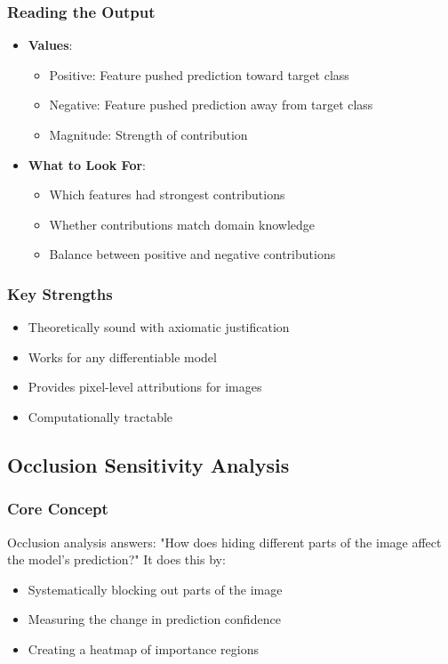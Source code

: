 \documentclass{article}
\begin{document}
\subsubsection{Reading the Output}
\begin{itemize}
    \item \textbf{Values}:
        \begin{itemize}
            \item Positive: Feature pushed prediction toward target class
            \item Negative: Feature pushed prediction away from target class
            \item Magnitude: Strength of contribution
        \end{itemize}
    \item \textbf{What to Look For}:
        \begin{itemize}
            \item Which features had strongest contributions
            \item Whether contributions match domain knowledge
            \item Balance between positive and negative contributions
        \end{itemize}
\end{itemize}

\subsubsection{Key Strengths}
\begin{itemize}
    \item Theoretically sound with axiomatic justification
    \item Works for any differentiable model
    \item Provides pixel-level attributions for images
    \item Computationally tractable
\end{itemize}

\subsection{Occlusion Sensitivity Analysis}

\subsubsection{Core Concept}
Occlusion analysis answers: "How does hiding different parts of the image affect the model's prediction?" It does this by:
\begin{itemize}
    \item Systematically blocking out parts of the image
    \item Measuring the change in prediction confidence
    \item Creating a heatmap of importance regions
\end{itemize}
\end{document}
